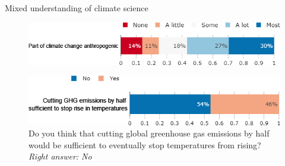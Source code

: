 \begin{framefont}{\small}
\begin{frame}{Mixed understanding of climate science}%
	\begin{figure}%
	\centering
	\caption{What part of climate change do you think is due to human activity? \footnotesize{\textit{Right answer: Most}}}
	\includegraphics[width=.7\paperwidth]{../figures/FR/CC_anthropogenic_FR.png} 
	\\
	\caption{Do you think that cutting global greenhouse gas emissions by half would be sufficient to eventually stop temperatures from rising? \footnotesize{\textit{Right answer: No}}}
	\includegraphics[width=.6\paperwidth]{../figures/FR/CC_dynamic_FR.png}
	
	\end{figure}
\end{frame}
	
	


\end{framefont}
